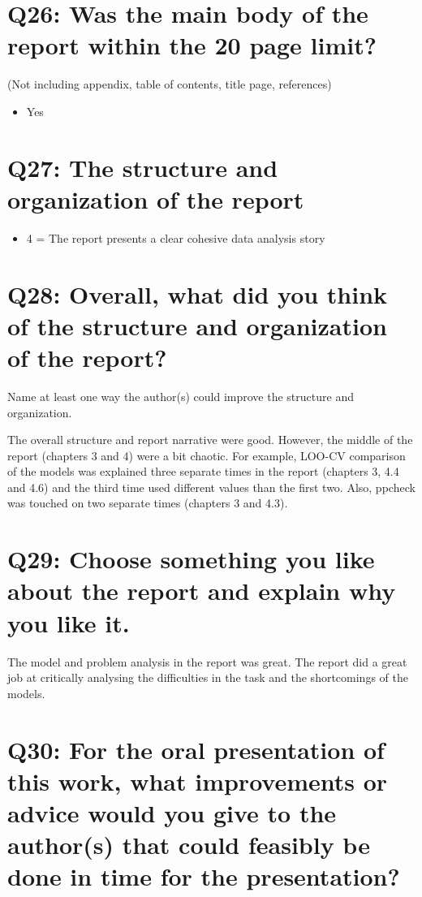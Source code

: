 \documentclass[11pt,a4paper]{article}
\begin{document}
\section{Q26: Was the main body of the report within the 20 page limit?}
(Not including appendix, table of contents, title page, references)
\begin{itemize}
    \item Yes
\end{itemize}

\section{Q27: The structure and organization of the report}
\begin{itemize}
    \item 4 = The report presents a clear cohesive data analysis story
\end{itemize}

\section{Q28: Overall, what did you think of the structure and organization of the report?}
Name at least one way the author(s) could improve the structure and organization.

The overall structure and report narrative were good. However, the middle of the report (chapters 3 and 4) were a bit chaotic. For example, LOO-CV comparison of the models was explained three separate times in the report (chapters 3, 4.4 and 4.6) and the third time used different values than the first two. Also, ppcheck was touched on two separate times (chapters 3 and 4.3).

\section{Q29: Choose something you like about the report and explain why you like it.}
The model and problem analysis in the report was great. The report did a great job at critically analysing the difficulties in the task and the shortcomings of the models.

\section{Q30: For the oral presentation of this work, what improvements or advice would you give to the author(s) that could feasibly be done in time for the presentation?}
\end{document}
